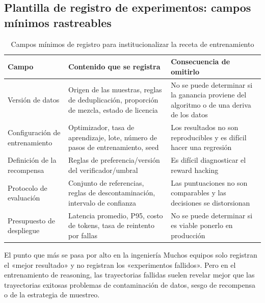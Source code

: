 \subsection{Plantilla de registro de experimentos: campos mínimos rastreables}
\begin{table}[H]
\centering
\renewcommand{\arraystretch}{1.2}
\begin{tabular}{p{3.0cm}p{3.7cm}p{4.1cm}}
\toprule
\textbf{Campo} & \textbf{Contenido que se registra} & \textbf{Consecuencia de omitirlo} \\
\midrule
Versión de datos & Origen de las muestras, reglas de deduplicación, proporción de mezcla, estado de licencia & No se puede determinar si la ganancia proviene del algoritmo o de una deriva de los datos \\
Configuración de entrenamiento & Optimizador, tasa de aprendizaje, lote, número de pasos de entrenamiento, seed & Los resultados no son reproducibles y es difícil hacer una regresión \\
Definición de la recompensa & Reglas de preferencia/versión del verificador/umbral & Es difícil diagnosticar el reward hacking \\
Protocolo de evaluación & Conjunto de referencias, reglas de descontaminación, intervalo de confianza & Las puntuaciones no son comparables y las decisiones se distorsionan \\
Presupuesto de despliegue & Latencia promedio, P95, costo de tokens, tasa de reintento por fallas & No se puede determinar si es viable ponerlo en producción \\
\bottomrule
\end{tabular}
\caption{Campos mínimos de registro para institucionalizar la receta de entrenamiento}
\end{table}

\begin{knowledgebox}{El punto que más se pasa por alto en la ingeniería}
Muchos equipos solo registran el «mejor resultado» y no registran los «experimentos fallidos». Pero en el entrenamiento de reasoning, las trayectorias fallidas suelen revelar mejor que las trayectorias exitosas problemas de contaminación de datos, sesgo de recompensa o de la estrategia de muestreo.
\end{knowledgebox}

